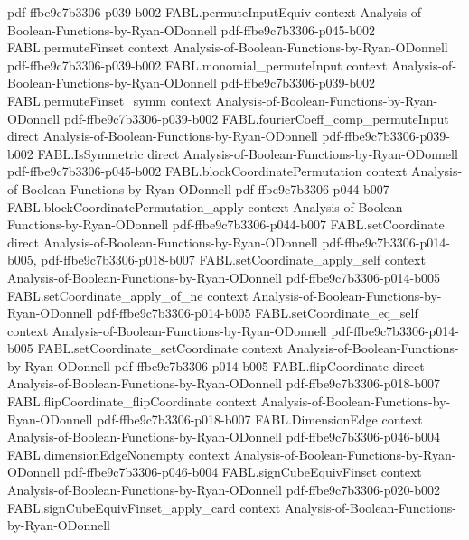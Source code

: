 \begin{theorem}
{    pdf-ffbe9c7b3306-p039-b002}
\proofstep
  {FABL.permuteInputEquiv}
  {context}
  {Analysis-of-Boolean-Functions-by-Ryan-ODonnell}
  {pdf-ffbe9c7b3306-p045-b002}
\proofstep
  {FABL.permuteFinset}
  {context}
  {Analysis-of-Boolean-Functions-by-Ryan-ODonnell}
  {pdf-ffbe9c7b3306-p039-b002}
\proofstep
  {FABL.monomial_permuteInput}
  {context}
  {Analysis-of-Boolean-Functions-by-Ryan-ODonnell}
  {pdf-ffbe9c7b3306-p039-b002}
\proofstep
  {FABL.permuteFinset_symm}
  {context}
  {Analysis-of-Boolean-Functions-by-Ryan-ODonnell}
  {pdf-ffbe9c7b3306-p039-b002}
\proofstep
  {FABL.fourierCoeff_comp_permuteInput}
  {direct}
  {Analysis-of-Boolean-Functions-by-Ryan-ODonnell}
  {pdf-ffbe9c7b3306-p039-b002}
\proofstep
  {FABL.IsSymmetric}
  {direct}
  {Analysis-of-Boolean-Functions-by-Ryan-ODonnell}
  {pdf-ffbe9c7b3306-p045-b002}
\proofstep
  {FABL.blockCoordinatePermutation}
  {context}
  {Analysis-of-Boolean-Functions-by-Ryan-ODonnell}
  {pdf-ffbe9c7b3306-p044-b007}
\proofstep
  {FABL.blockCoordinatePermutation_apply}
  {context}
  {Analysis-of-Boolean-Functions-by-Ryan-ODonnell}
  {pdf-ffbe9c7b3306-p044-b007}
\proofstep
  {FABL.setCoordinate}
  {direct}
  {Analysis-of-Boolean-Functions-by-Ryan-ODonnell}
  {pdf-ffbe9c7b3306-p014-b005,
    pdf-ffbe9c7b3306-p018-b007}
\proofstep
  {FABL.setCoordinate_apply_self}
  {context}
  {Analysis-of-Boolean-Functions-by-Ryan-ODonnell}
  {pdf-ffbe9c7b3306-p014-b005}
\proofstep
  {FABL.setCoordinate_apply_of_ne}
  {context}
  {Analysis-of-Boolean-Functions-by-Ryan-ODonnell}
  {pdf-ffbe9c7b3306-p014-b005}
\proofstep
  {FABL.setCoordinate_eq_self}
  {context}
  {Analysis-of-Boolean-Functions-by-Ryan-ODonnell}
  {pdf-ffbe9c7b3306-p014-b005}
\proofstep
  {FABL.setCoordinate_setCoordinate}
  {context}
  {Analysis-of-Boolean-Functions-by-Ryan-ODonnell}
  {pdf-ffbe9c7b3306-p014-b005}
\proofstep
  {FABL.flipCoordinate}
  {direct}
  {Analysis-of-Boolean-Functions-by-Ryan-ODonnell}
  {pdf-ffbe9c7b3306-p018-b007}
\proofstep
  {FABL.flipCoordinate_flipCoordinate}
  {context}
  {Analysis-of-Boolean-Functions-by-Ryan-ODonnell}
  {pdf-ffbe9c7b3306-p018-b007}
\proofstep
  {FABL.DimensionEdge}
  {context}
  {Analysis-of-Boolean-Functions-by-Ryan-ODonnell}
  {pdf-ffbe9c7b3306-p046-b004}
\proofstep
  {FABL.dimensionEdgeNonempty}
  {context}
  {Analysis-of-Boolean-Functions-by-Ryan-ODonnell}
  {pdf-ffbe9c7b3306-p046-b004}
\proofstep
  {FABL.signCubeEquivFinset}
  {context}
  {Analysis-of-Boolean-Functions-by-Ryan-ODonnell}
  {pdf-ffbe9c7b3306-p020-b002}
\proofstep
  {FABL.signCubeEquivFinset_apply_card}
  {context}
  {Analysis-of-Boolean-Functions-by-Ryan-ODonnell}

\end{theorem}
